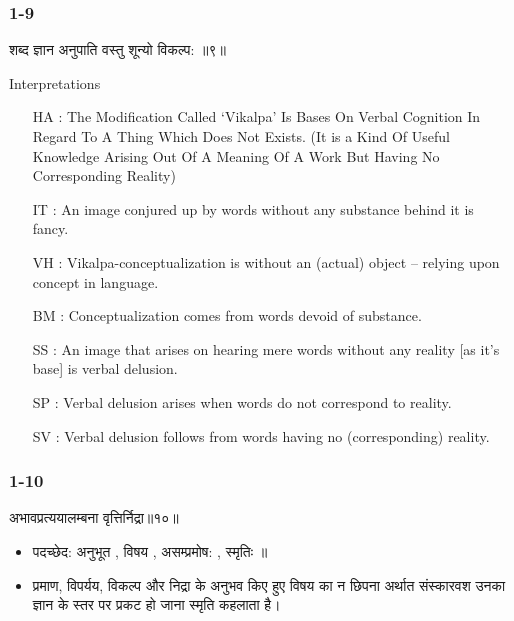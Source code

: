 \begin{frame}[fragile]\frametitle{1-9}

\begin{sanskrit}
शब्द ज्ञान अनुपाति वस्तु शून्यो विकल्प: ॥९॥
\end{sanskrit}


Interpretations
\begin{itemize}		
\item [HA]: The Modification Called ‘Vikalpa’ Is Bases On Verbal Cognition In Regard To A Thing Which Does Not Exists. (It is a Kind Of Useful Knowledge Arising Out Of A Meaning Of A Work But Having No Corresponding Reality)
\item [IT]: An image conjured up by words without any substance behind it is fancy.
\item [VH]: Vikalpa-conceptualization is without an (actual) object – relying upon concept in language.
\item [BM]: Conceptualization comes from words devoid of substance.
\item [SS]: An image that arises on hearing mere words without any reality [as it’s base] is verbal delusion.
\item [SP]: Verbal delusion arises when words do not correspond to reality.
\item [SV]: Verbal delusion follows from words having no (corresponding) reality.
\end{itemize}

\end{frame}

\begin{frame}[fragile]\frametitle{1-10}

\begin{sanskrit}
अभावप्रत्ययालम्बना वृत्तिर्निद्रा॥१०॥
\end{sanskrit}

\begin{itemize}
\item पदच्छेद: अनुभूत , विषय , असम्प्रमोष: , स्मृतिः ॥
\item प्रमाण, विपर्यय, विकल्प और निद्रा के अनुभव किए हुए विषय का न छिपना अर्थात संस्कारवश उनका ज्ञान के स्तर पर प्रकट हो जाना स्मृति कहलाता है।
\end{itemize}

\end{frame}


